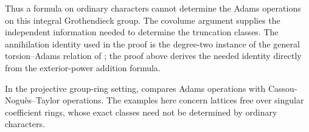 Thus a formula on ordinary characters cannot determine the Adams
operations on this integral Grothendieck group.  The covolume argument supplies the independent information needed
to determine the truncation classes.
The annihilation identity used in the proof is the degree-two instance
of the general torsion--Adams relation of
\citet[Proposition~2, p.~2]{Clauwens2010}; the proof above derives the
needed identity directly from the exterior-power addition formula.

In the projective group-ring setting,
\citet[Propositions~4.2.3 and~4.3.2, pp.~1490--1492]{Pappas2015}
compares Adams operations with Cassou-Nogu\`es--Taylor operations.
The examples here concern lattices free over singular coefficient
rings, whose exact classes need not be determined by ordinary characters.
